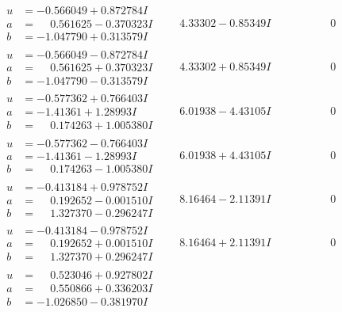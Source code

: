 \documentclass[1p]{elsarticle_modified}
\theoremstyle{definition}
\begin{document}
$$\begin{array}{c|c|c}
\begin{aligned}
u &= -0.566049 + 0.872784 I \\
a &= \phantom{-}0.561625 - 0.370323 I \\
b &= -1.047790 + 0.313579 I\end{aligned}
 & \phantom{-}4.33302 - 0.85349 I & \phantom{-0.000000 } 0 \\ \hline\begin{aligned}
u &= -0.566049 - 0.872784 I \\
a &= \phantom{-}0.561625 + 0.370323 I \\
b &= -1.047790 - 0.313579 I\end{aligned}
 & \phantom{-}4.33302 + 0.85349 I & \phantom{-0.000000 } 0 \\ \hline\begin{aligned}
u &= -0.577362 + 0.766403 I \\
a &= -1.41361 + 1.28993 I \\
b &= \phantom{-}0.174263 + 1.005380 I\end{aligned}
 & \phantom{-}6.01938 - 4.43105 I & \phantom{-0.000000 } 0 \\ \hline\begin{aligned}
u &= -0.577362 - 0.766403 I \\
a &= -1.41361 - 1.28993 I \\
b &= \phantom{-}0.174263 - 1.005380 I\end{aligned}
 & \phantom{-}6.01938 + 4.43105 I & \phantom{-0.000000 } 0 \\ \hline\begin{aligned}
u &= -0.413184 + 0.978752 I \\
a &= \phantom{-}0.192652 - 0.001510 I \\
b &= \phantom{-}1.327370 - 0.296247 I\end{aligned}
 & \phantom{-}8.16464 - 2.11391 I & \phantom{-0.000000 } 0 \\ \hline\begin{aligned}
u &= -0.413184 - 0.978752 I \\
a &= \phantom{-}0.192652 + 0.001510 I \\
b &= \phantom{-}1.327370 + 0.296247 I\end{aligned}
 & \phantom{-}8.16464 + 2.11391 I & \phantom{-0.000000 } 0 \\ \hline\begin{aligned}
u &= \phantom{-}0.523046 + 0.927802 I \\
a &= \phantom{-}0.550866 + 0.336203 I \\
b &= -1.026850 - 0.381970 I\end{aligned}

\end{array}$$
\end{document}
